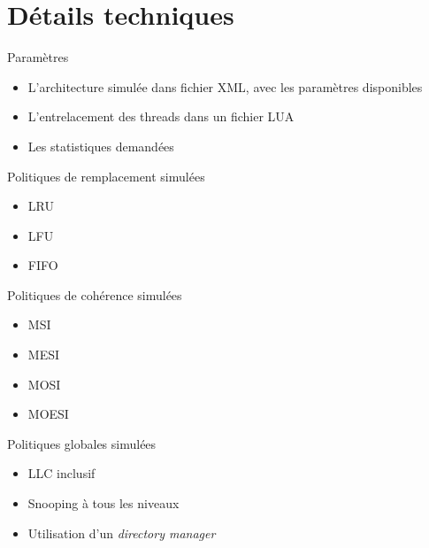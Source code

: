 \documentclass{beamer}
\begin{document}
\section{Détails techniques}
\begin{frame}
\begin{block}{Paramètres}
\begin{itemize}
  \item{L'architecture simulée dans fichier XML, avec les paramètres disponibles}
  \item{L'entrelacement des threads dans un fichier LUA}
  \item{Les statistiques demandées}
\end{itemize}
\end{block}
\end{frame}

\begin{frame}
\begin{block}{Politiques de remplacement simulées}
\begin{itemize}
  \item{LRU}
  \item{LFU}
  \item{FIFO}
\end{itemize}
\end{block}

\begin{block}{Politiques de cohérence simulées}
\begin{itemize}
  \item{MSI}
  \item{MESI}
  \item{MOSI}
  \item{MOESI}
\end{itemize}
\end{block}

\begin{block}{Politiques globales simulées}
\begin{itemize}
  \item{LLC inclusif}
  \item{Snooping à tous les niveaux}
  \item{Utilisation d'un \emph{directory manager}}
\end{itemize}
\end{block}

\end{frame}
\end{document}
